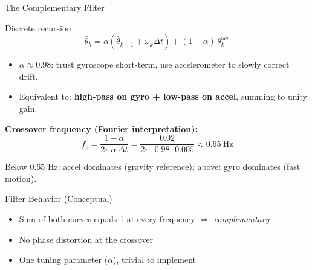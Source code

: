 \documentclass[10pt]{beamer}
\begin{document}
\begin{frame}{The Complementary Filter}
  \begin{block}{Discrete recursion}
    \[
      \boxed{\;
      \hat{\theta}_k = \alpha\!\left(\hat{\theta}_{k-1} + \omega_k \Delta t\right) + (1 - \alpha)\,\theta_k^{\text{acc}}
      \;}
    \]
  \end{block}

  \begin{itemize}
    \item $\alpha \approx 0.98$: trust gyroscope short-term, use accelerometer to slowly correct drift.
    \item Equivalent to: \textbf{high-pass on gyro + low-pass on accel}, summing to unity gain.
  \end{itemize}

  \textbf{Crossover frequency (Fourier interpretation):}
  \[
    f_c = \frac{1 - \alpha}{2\pi\,\alpha\,\Delta t}
    = \frac{0.02}{2\pi \cdot 0.98 \cdot 0.005}
    \approx 0.65\ \text{Hz}
  \]

  \scriptsize
  Below 0.65 Hz: accel dominates (gravity reference); above: gyro dominates (fast motion).
\end{frame}

\begin{frame}{Filter Behavior (Conceptual)}
  \begin{center}
  \end{center}

  \begin{itemize}
    \item Sum of both curves equals 1 at every frequency $\Rightarrow$ \emph{complementary}
    \item No phase distortion at the crossover
    \item One tuning parameter ($\alpha$), trivial to implement
  \end{itemize}
\end{frame}
\end{document}

